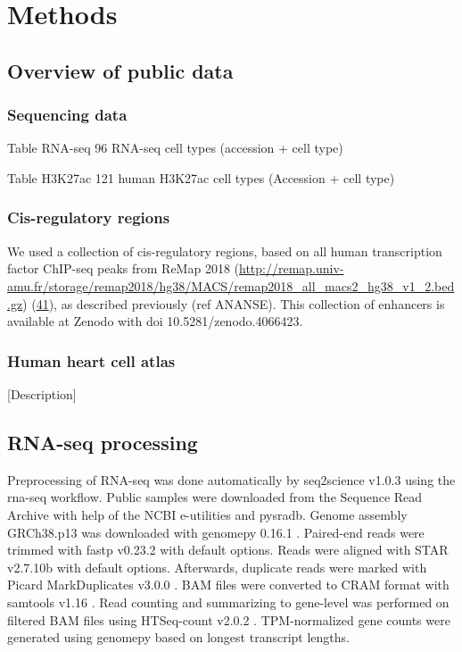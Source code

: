\section{Methods}

\subsection{Overview of public data}

\subsubsection{Sequencing data}

Table RNA-seq
 96  RNA-seq cell types (accession + cell type)
 
 Table H3K27ac
 121 human H3K27ac cell types (Accession + cell type)

\subsubsection{Cis-regulatory regions}

We used a collection of cis-regulatory regions, based on all human transcription factor ChIP-seq peaks from ReMap 2018 (\href{http://remap.univ-amu.fr/storage/remap2018/hg38/MACS/remap2018_all_macs2_hg38_v1_2.bed.gz}{http://remap.univ-amu.fr/storage/remap2018/hg38/MACS/remap2018\_all\_macs2\_hg38\_v1\_2.bed.gz}) (\href{javascript:;}{41}), as described previously (ref ANANSE). This collection of enhancers is available at Zenodo with doi 10.5281/zenodo.4066423.

\subsubsection{Human heart cell atlas}

[Description]

\subsection{RNA-seq processing}

Preprocessing of RNA-seq was done automatically by seq2science v1.0.3 \cite{seq2science} using the rna-seq workflow. Public samples were downloaded from the Sequence Read Archive \cite{Leinonen2010} with help of the NCBI e-utilities and pysradb\cite{Choudhary2019}. Genome assembly GRCh38.p13 was downloaded with genomepy 0.16.1 \cite{Frlich2023}. Paired-end reads were trimmed with fastp v0.23.2 \cite{Chen2018} with default options. Reads were aligned with STAR v2.7.10b \cite{Dobin2012} with default options. Afterwards, duplicate reads were marked with Picard MarkDuplicates v3.0.0 \cite{picard}. BAM files were converted to CRAM format with samtools v1.16 \cite{Danecek2021}. Read counting and summarizing to gene-level was performed on filtered BAM files using HTSeq-count v2.0.2 \cite{Anders2014}. TPM-normalized gene counts were generated using genomepy based on longest transcript lengths.

